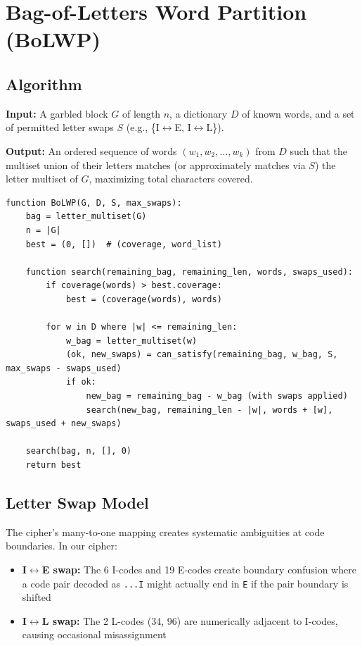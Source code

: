 \documentclass[11pt,a4paper]{article}
\begin{document}
\section{Bag-of-Letters Word Partition (BoLWP)}

\subsection{Algorithm}

\textbf{Input:} A garbled block $G$ of length $n$, a dictionary $D$ of known words, and a set of permitted letter swaps $S$ (e.g., \{I$\leftrightarrow$E, I$\leftrightarrow$L\}).

\textbf{Output:} An ordered sequence of words $(w_1, w_2, \ldots, w_k)$ from $D$ such that the multiset union of their letters matches (or approximately matches via $S$) the letter multiset of $G$, maximizing total characters covered.

\begin{lstlisting}[style=plain]
function BoLWP(G, D, S, max_swaps):
    bag = letter_multiset(G)
    n = |G|
    best = (0, [])  # (coverage, word_list)

    function search(remaining_bag, remaining_len, words, swaps_used):
        if coverage(words) > best.coverage:
            best = (coverage(words), words)

        for w in D where |w| <= remaining_len:
            w_bag = letter_multiset(w)
            (ok, new_swaps) = can_satisfy(remaining_bag, w_bag, S, max_swaps - swaps_used)
            if ok:
                new_bag = remaining_bag - w_bag (with swaps applied)
                search(new_bag, remaining_len - |w|, words + [w], swaps_used + new_swaps)

    search(bag, n, [], 0)
    return best
\end{lstlisting}

\subsection{Letter Swap Model}

The cipher's many-to-one mapping creates systematic ambiguities at code boundaries. In our cipher:

\begin{itemize}
\item \textbf{I$\leftrightarrow$E swap:} The 6 I-codes and 19 E-codes create boundary confusion where a code pair decoded as \texttt{...I} might actually end in \texttt{E} if the pair boundary is shifted
\item \textbf{I$\leftrightarrow$L swap:} The 2 L-codes (34, 96) are numerically adjacent to I-codes, causing occasional misassignment
\end{itemize}
\end{document}
